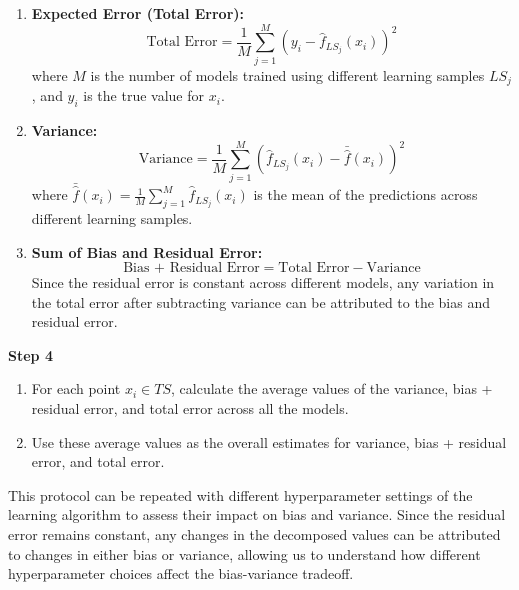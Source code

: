 \documentclass[a4paper,10pt]{article}
\begin{document}
\begin{enumerate}
    \item \textbf{Expected Error (Total Error):}
    \[
    \text{Total Error} = \frac{1}{M} \sum_{j=1}^M (y_i - \hat{f}_{LS_j}(x_i))^2
    \]
    where \( M \) is the number of models trained using different learning samples \( LS_j \), and \( y_i \) is the true value for \( x_i \).

    \item \textbf{Variance:}
    \[
    \text{Variance} = \frac{1}{M} \sum_{j=1}^M (\hat{f}_{LS_j}(x_i) - \bar{\hat{f}}(x_i))^2
    \]
    where \( \bar{\hat{f}}(x_i) = \frac{1}{M} \sum_{j=1}^M \hat{f}_{LS_j}(x_i) \) is the mean of the predictions across different learning samples.

    \item \textbf{Sum of Bias and Residual Error:}
    \[
    \text{Bias + Residual Error} = \text{Total Error} - \text{Variance}
    \]
    Since the residual error is constant across different models, any variation in the total error after subtracting variance can be attributed to the bias and residual error.
\end{enumerate}

\textbf{Step 4}
\begin{enumerate}
    \item For each point \( x_i \in TS \), calculate the average values of the variance, bias + residual error, and total error across all the models.
    \item Use these average values as the overall estimates for variance, bias + residual error, and total error.
\end{enumerate}


\vspace{0.4cm}

This protocol can be repeated with different hyperparameter settings of the learning algorithm to assess their impact on bias and variance. Since the residual error remains constant, any changes in the decomposed values can be attributed to changes in either bias or variance, allowing us to understand how different hyperparameter choices affect the bias-variance tradeoff.


    

    

    

    
\end{document}
